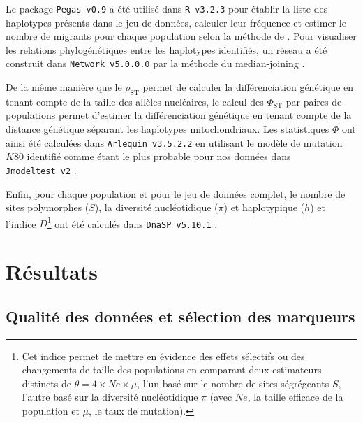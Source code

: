 \documentclass[a4paper,12pt,twoside]{article}\usepackage[]{graphicx}\usepackage[]{color}
\begin{document}
Le package \texttt{Pegas~v0.9} \citep{paradis2010} a été utilisé dans \texttt{R~v3.2.3} \citep{rct2015} pour établir la liste des haplotypes présents dans le jeu de données, calculer leur fréquence et estimer le nombre de migrants pour chaque population selon la méthode de \citet{barton1986}. Pour visualiser les relations phylogénétiques entre les haplotypes identifiés, un réseau a été construit dans \texttt{Network~v5.0.0.0} \citep{bandelt1999} par la méthode du median-joining \citep{cassens2003}.

De la même manière que le $\rho_\textrm{ST}$ permet de calculer la différenciation génétique en tenant compte de la taille des allèles nucléaires, le calcul des $\Phi_\textrm{ST}$ par paires de populations permet d'estimer la différenciation génétique en tenant compte de la distance génétique séparant les haplotypes mitochondriaux. Les statistiques $\Phi$ ont ainsi été calculées dans \texttt{Arlequin~v3.5.2.2} \citep{excoffier2010} en utilisant le modèle de mutation $K80$ identifié comme étant le plus probable pour nos données dans \texttt{Jmodeltest~v2} \citep{santorum2014}.

Enfin, pour chaque population et pour le jeu de données complet, le nombre de sites polymorphes ($S$), la diversité nucléotidique ($\pi$) et haplotypique ($h$) \citep[selon la méthode décrite par][]{tajima1983} et l'indice $D$\footnote{Cet indice permet de mettre en évidence des effets sélectifs ou des changements de taille des populations en comparant deux estimateurs distincts de $\theta = 4\times Ne \times \mu$, l'un basé sur le nombre de sites ségrégeants $S$, l'autre basé sur la diversité nucléotidique $\pi$ (avec $Ne$, la taille efficace de la population et $\mu$, le taux de mutation).} \citep{tajima1989} ont été calculés dans \texttt{DnaSP~v5.10.1} \citep{librado2009}.


\section{Résultats}



\subsection{Qualité des données et sélection des marqueurs}
\end{document}
